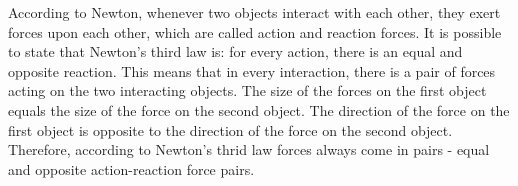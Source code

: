 According to Newton, whenever two objects interact with each other, they exert forces upon each other, which are called action and reaction forces. It is possible to state that Newton's third law is: for every action, there is an equal and opposite reaction. This means that in every interaction, there is a pair of forces acting on the two interacting objects. The size of the forces on the first object equals the size of the force on the second object. The direction of the force on the first object is opposite to the direction of the force on the second object. Therefore, according to Newton's thrid law forces always come in pairs - equal and opposite action-reaction force pairs. 
